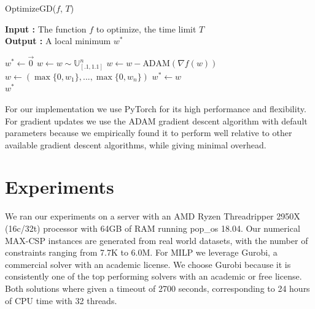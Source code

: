 \documentclass[a4paper]{article}
\begin{document}
\begin{algorithm}[H]
\caption{OptimizeGD($f$, $T$)}
\textbf{Input : } The function $f$ to optimize, the time limit $T$\\
\textbf{Output : } A local minimum $w^*$
\begin{algorithmic}[1]
	\State $w^* \gets \overrightarrow{0}$ 
		\State $w \gets w \sim \mathds{U}_{[.1,1.1]}^n$ 
				\State $w \gets w - \text{ADAM}(\nabla f(w))$ 
				\State $w \gets (\max\{0, w_1\},..., \max\{0, w_n\})$ 
			\EndFor
				\State $w^* \gets w$ 
			\EndIf
		\EndFor
	\EndWhile
	\\\Return $w^*$
\end{algorithmic}
\end{algorithm}

For our implementation we use PyTorch \cite{pytorch} for its high performance
and flexibility. For gradient updates we use the ADAM gradient descent algorithm with default parameters
\cite{ADAM_paper} because we empirically found it to perform well relative to
other available gradient descent algorithms, while giving minimal overhead. 

\section{Experiments}

We ran our experiments on a server with an AMD Ryzen Threadripper 2950X
(16c/32t) processor with 64GB of RAM running pop\_os 18.04. Our numerical MAX-CSP
instances are generated from real world datasets, with the number of
constraints ranging from 7.7K to 6.0M.  For MILP we leverage Gurobi, a
commercial solver with an academic license. We choose Gurobi because it is
consistently one of the top performing solvers \cite{benchmark} with an
academic or free license. Both solutions where given a timeout of 2700 seconds,
corresponding to 24 hours of CPU time with 32 threads.
\end{document}
